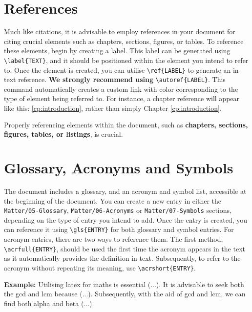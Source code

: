 \section{References}
Much like citations, it is advisable to employ references in your document for citing crucial elements such as chapters, sections, figures, or tables. To reference these elements, begin by creating a label. This label can be generated using \verb|\label{TEXT}|, and it should be positioned within the element you intend to refer to. Once the element is created, you can utilise \verb|\ref{LABEL}| to generate an in-text reference. \textbf{We strongly recommend using} \verb|\autoref{LABEL}|. This command automatically creates a custom link with color corresponding to the type of element being referred to. For instance, a chapter reference will appear like this: \autoref{cp:introduction}, rather than simply Chapter \ref{cp:introduction}. 

\begin{block}[tip]
Properly referencing elements within the document, such as \textbf{chapters, sections, figures, tables, or listings}, is crucial.
\end{block}

\section{Glossary, Acronyms and Symbols}
The document includes a glossary, and an acronym and symbol list, accessible at the beginning of the document. You can create a new entry in either the \verb|Matter/05-Glossary|, \verb|Matter/06-Acronyms| or \verb|Matter/07-Symbols| sections, depending on the type of entry you intend to add. Once the entry is created, you can reference it using \verb|\gls{ENTRY}| for both glossary and symbol entries. For acronym entries, there are two ways to reference them. The first method, \verb|\acrfull{ENTRY}|, should be used the first time the acronym appears in the text as it automatically provides the definition in-text. Subsequently, to refer to the acronym without repeating its meaning, use \verb|\acrshort{ENTRY}|.

\vspace{.875em}
\noindent\textbf{Example:} Utilising \Gls{latex} for \Gls{maths} is essential (...). It is advisable to seek both the \acrfull{gcd} and \acrfull{lcm} because (...). Subsequently, with the aid of \acrshort{gcd} and \acrshort{lcm}, we can find both \gls{alpha} and \gls{beta} (...).

